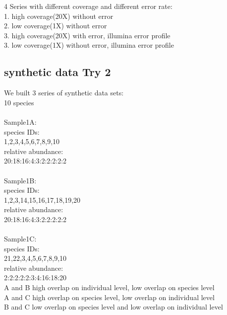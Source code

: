 \documentclass[10pt]{article}
\begin{document}
4 Series with different coverage and different error rate:\\
1. high coverage(20X) without error\\
2. low coverage(1X) without error\\
3. high coverage(20X) with error, illumina error profile\\
3. low coverage(1X) without error, illumina error profile\\
%


\subsection*{synthetic data Try 2}

We built 3 series of synthetic data sets:
\\
10 species\\
\\
Sample1A:\\
species IDs:\\
1,2,3,4,5,6,7,8,9,10\\
relative abundance:\\
20:18:16:4:3:2:2:2:2:2\\
\\
Sample1B:\\
species IDs:\\
1,2,3,14,15,16,17,18,19,20\\
relative abundance:\\
20:18:16:4:3:2:2:2:2:2\\
\\
Sample1C:\\
species IDs:\\
21,22,3,4,5,6,7,8,9,10\\
relative abundance:\\
2:2:2:2:2:3:4:16:18:20\\

A and B high overlap on individual level, low overlap on species level\\
A and C high overlap on species level, low overlap on individual level\\
B and C low overlap on species level and low overlap on individual level\\
\end{document}
